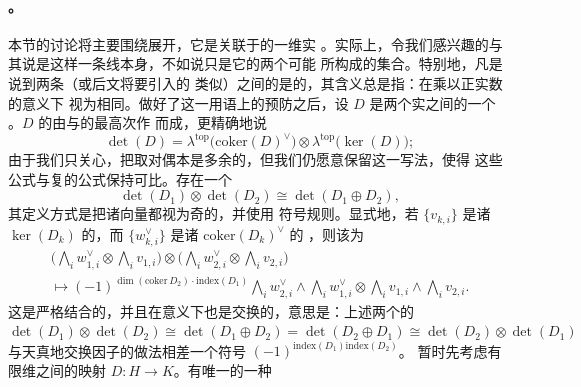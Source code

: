 \paragraph{\trDeterminantLine{}。}\label{sub:determinant-lines}
本节的讨论将主要围绕\trDeterminantLine{}展开，它是关联于\trFredholmOperator{}的一维实%
\trVectorSpace。实际上，令我们感兴趣的与其说是这样一条线本身，不如说只是它的两个可能%
\trOrientation{}所构成的集合。特别地，凡是说到两条\trDeterminantLine{}（或后文将要引入的
类似\trObject）之间的\trIsomorphism{}是\trCanonical{}的，其含义总是指：在乘以正实数的意义下
视为相同。做好了这一用语上的预防之后，设 $D$ 是两个实\trBanachSpace{}之间的一个%
\trFredholmOperator。$D$ 的\trDeterminantLine{}由\trKernel{}与\trCokernel{}的最高次\trExteriorPower{}作%
\trTensorProduct{}而成，更精确地说
\begin{equation*}
\det(D)=\lambda^{\mathrm{top}}\bigl(\mathrm{coker}(D)^{\vee}\bigr)\otimes
\lambda^{\mathrm{top}}\bigl(\ker(D)\bigr);
\end{equation*}
由于我们只关心\trOrientation，把\trCokernel{}取对偶本是多余的，但我们仍愿意保留这一写法，使得
这些公式与复\trDeterminantLine{}的公式保持可比。存在一个\trCanonical{}\trIsomorphism
\begin{equation}\label{eq:det-direct-sum}
\det(D_1)\otimes\det(D_2)\cong\det(D_1\oplus D_2),
\end{equation}
其定义方式是把诸向量都视为奇的，并使用 \trKoszul{}符号规则。显式地，若 $\{v_{k,i}\}$
是诸 $\ker(D_k)$ 的\trBasis，而 $\{w^{\vee}_{k,i}\}$ 是诸 $\mathrm{coker}(D_k)^{\vee}$ 的%
\trBasis，则该\trIsomorphism{}为
\begin{equation}\label{eq:det-koszul-iso}
\begin{split}
\bigl(\textstyle\bigwedge_i w^{\vee}_{1,i}\otimes\bigwedge_i v_{1,i}\bigr)\otimes
\bigl(\textstyle\bigwedge_i w^{\vee}_{2,i}\otimes\bigwedge_i v_{2,i}\bigr)
\qquad\qquad\qquad\quad\\
\longmapsto(-1)^{\dim(\mathrm{coker}\,D_2)\cdot\mathrm{index}(D_1)}
\textstyle\bigwedge_i w^{\vee}_{2,i}\wedge\bigwedge_i w^{\vee}_{1,i}\otimes
\textstyle\bigwedge_i v_{1,i}\wedge\bigwedge_i v_{2,i}.
\end{split}
\end{equation}
这是严格结合的，并且在\trGraded{}意义下也是交换的，意思是：上述两个\trIsomorphism{}的%
\trComposition
$\det(D_1)\otimes\det(D_2)\cong\det(D_1\oplus D_2)=\det(D_2\oplus D_1)\cong
\det(D_2)\otimes\det(D_1)$
与天真地交换因子的做法相差一个符号 $(-1)^{\mathrm{index}(D_1)\mathrm{index}(D_2)}$。
暂时先考虑有限维\trVectorSpace{}之间的\trLinear{}映射 $D\colon H\to K$。有唯一的一种
